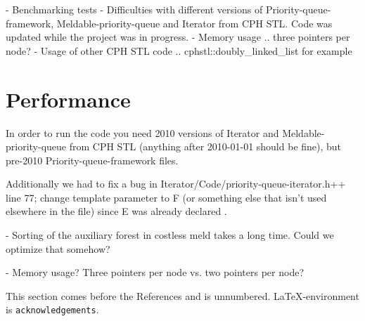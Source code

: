 \documentclass{DIKU-article}[2010/01/13]
\begin{document}
- Benchmarking tests
- Difficulties with different versions of Priority-queue-framework,
  Meldable-priority-queue and Iterator from CPH STL. Code was updated while the
  project was in progress.
- Memory usage .. three pointers per node?
- Usage of other CPH STL code .. cphstl::doubly\_linked\_list for example

\section{Performance}

In order to run the code you need 2010 versions of Iterator and
Meldable-priority-queue from CPH STL (anything after 2010-01-01 should be fine),
but pre-2010 Priority-queue-framework files.

Additionally we had to fix a bug in Iterator/Code/priority-queue-iterator.h++
line 77; change template parameter to F (or something else that isn't used
elsewhere in the file) since E was already declared .

- Sorting of the auxiliary forest in costless meld takes a long time. Could we
  optimize that somehow?

- Memory usage? Three pointers per node vs. two pointers per node?

\begin{acknowledgements}
This section comes before the References and is unnumbered.
\LaTeX-en\-viron\-ment is \verb|acknowledgements|.
\end{acknowledgements}


\end{document}
